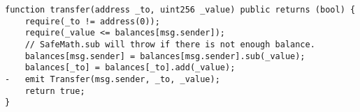 

\begin{lstlisting}[label={lst:rm-emit},language=Solidity,captionpos=b, caption={Transfers \_value amount of tokens to address \_to, and MUST fire the Transfer event}]
function transfer(address _to, uint256 _value) public returns (bool) {
    require(_to != address(0));
    require(_value <= balances[msg.sender]);
    // SafeMath.sub will throw if there is not enough balance.
    balances[msg.sender] = balances[msg.sender].sub(_value);
    balances[_to] = balances[_to].add(_value);
-   emit Transfer(msg.sender, _to, _value);
    return true;
}

\end{lstlisting}